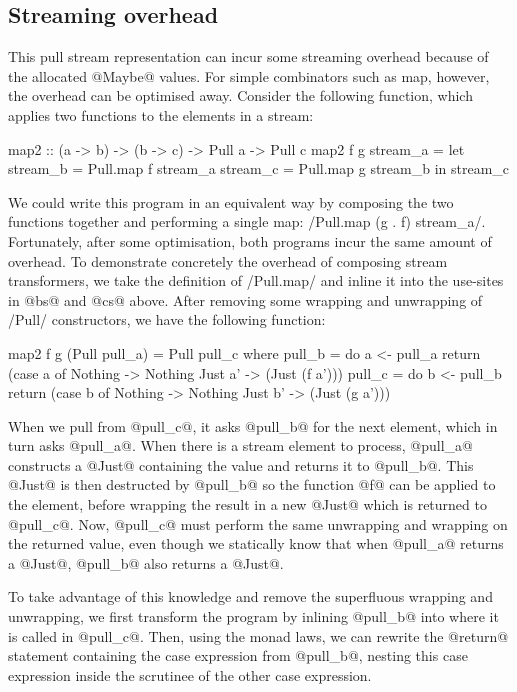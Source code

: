 \subsection{Streaming overhead}
\label{taxonomy/pull/streaming-overhead}

This pull stream representation can incur some streaming overhead because of the allocated @Maybe@ values.
For simple combinators such as map, however, the overhead can be optimised away.
Consider the following function, which applies two functions to the elements in a stream:

\begin{haskell}
map2 :: (a -> b) -> (b -> c) -> Pull a -> Pull c
map2 f g stream_a
 = let stream_b = Pull.map f stream_a
       stream_c = Pull.map g stream_b
   in  stream_c
\end{haskell}

We could write this program in an equivalent way by composing the two functions together and performing a single map: \Hs/Pull.map (g . f) stream_a/.
Fortunately, after some optimisation, both programs incur the same amount of overhead.
To demonstrate concretely the overhead of composing stream transformers, we take the definition of \Hs/Pull.map/ and inline it into the use-sites in @bs@ and @cs@ above.
After removing some wrapping and unwrapping of \Hs/Pull/ constructors, we have the following function:

\begin{haskell}
map2 f g (Pull pull_a) = Pull pull_c
 where
  pull_b = do
    a <- pull_a
    return (case a of
             Nothing -> Nothing
             Just a' -> (Just (f a')))
  pull_c = do
    b <- pull_b
    return (case b of
             Nothing -> Nothing
             Just b' -> (Just (g a')))
\end{haskell}

When we pull from @pull_c@, it asks @pull_b@ for the next element, which in turn asks @pull_a@.
When there is a stream element to process, @pull_a@ constructs a @Just@ containing the value and returns it to @pull_b@.
This @Just@ is then destructed by @pull_b@ so the function @f@ can be applied to the element, before wrapping the result in a new @Just@ which is returned to @pull_c@.
Now, @pull_c@ must perform the same unwrapping and wrapping on the returned value, even though we statically know that when @pull_a@ returns a @Just@, @pull_b@ also returns a @Just@.

To take advantage of this knowledge and remove the superfluous wrapping and unwrapping, we first transform the program by inlining @pull_b@ into where it is called in @pull_c@.
Then, using the monad laws, we can rewrite the @return@ statement containing the case expression from @pull_b@, nesting this case expression inside the scrutinee of the other case expression.

